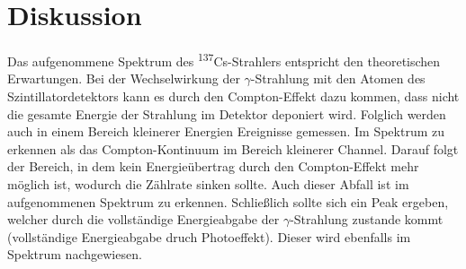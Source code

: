 \section{Diskussion}
\label{sec:Diskussion}

Das aufgenommene Spektrum des \textsuperscript{137}Cs-Strahlers entspricht den
theoretischen Erwartungen. Bei der Wechselwirkung der $\gamma$-Strahlung mit den
Atomen des Szintillatordetektors kann es durch den Compton-Effekt dazu kommen, dass
nicht die gesamte Energie der Strahlung im Detektor deponiert wird. Folglich werden
auch in einem Bereich kleinerer Energien Ereignisse gemessen. Im Spektrum zu erkennen
als das Compton-Kontinuum im Bereich kleinerer Channel. Darauf folgt der Bereich,
in dem kein Energieübertrag durch den Compton-Effekt mehr möglich ist, wodurch die
Zählrate sinken sollte. Auch dieser Abfall ist im aufgenommenen Spektrum zu erkennen.
Schließlich sollte sich ein Peak ergeben, welcher durch die vollständige Energieabgabe
der $\gamma$-Strahlung zustande kommt (vollständige Energieabgabe druch Photoeffekt).
Dieser wird ebenfalls im Spektrum nachgewiesen.
